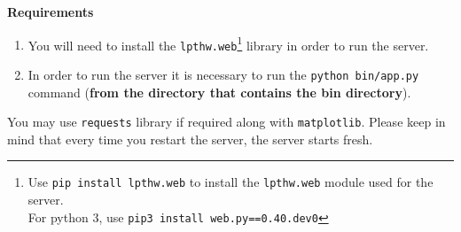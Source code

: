 \documentclass{WeSTassignment}
\begin{document}
\textbf{Requirements}
\begin{enumerate}
\item You will need to install the \texttt{lpthw.web}\footnote{Use \texttt{pip install lpthw.web} to install the \texttt{lpthw.web} module used for the server. \\For python 3, use \texttt{pip3 install web.py==0.40.dev0}} library in order to run the server.
\item In order to run the server it is necessary to run the \texttt{python bin/app.py} command (\textbf{from the directory that contains the bin directory}).

\end{enumerate}


You may use \texttt{requests} library if required along with \texttt{matplotlib}. 
Please keep in mind that every time you restart the server, the server starts fresh.  
\end{document}
